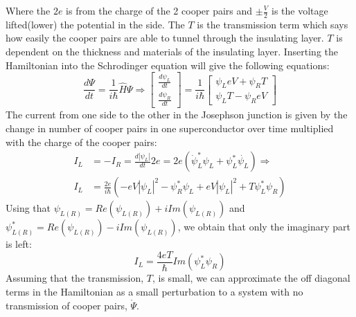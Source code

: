         Where the $2e$ is from the charge of the 2 cooper pairs and $ \pm \frac{V}{2}$ is the voltage lifted(lower) the potential in the side. The $T$ is the transmission term which says how easily the cooper pairs are able to tunnel through the insulating layer. $T$ is dependent on the thickness and materials of the insulating layer. Inserting the Hamiltonian into the Schrodinger equation will give the following equations: 
        \begin{equation}
                \frac{d \Psi}{d t} 
            =
                \frac{1}{i \hbar}\hat{H}\Psi
            \Rightarrow
                \begin{bmatrix}
                    \frac{d \psi_L}{dt} \\
                    \frac{d \psi_R}{dt} 
                \end{bmatrix}  
            =    
                \frac{1}{i \hbar} 
                \begin{bmatrix}
                \psi_L e V + \psi_R T \\
                \psi_L T - \psi_R e V  
                \end{bmatrix}
        \end{equation}
        The current from one side to the other in the Josephson junction is given by the change in number of cooper pairs in one superconductor over time multiplied with the charge of the cooper pairs: 
        \begin{equation}
            \begin{aligned}
                I_L &= -I_R =  \frac{d|\psi_L|}{dt} 2e = 2e \left( \Dot{\psi}_L^* \psi_L + \psi_L^* \Dot{\psi_L} \right) \Rightarrow 
                \\
                I_L &= \frac{2e}{i\hbar} \left( -eV |\psi_L|^2 - \psi_R^*\psi_L + e V  |\psi_L|^2 + T \psi_L^*\psi_R \right) 
            \end{aligned}
        \end{equation}
        Using that $\psi_{L(R)} = Re(\psi_{L(R)}) + i Im(\psi_{L(R)})$ and $\psi_{L(R)}^* = Re(\psi_{L(R)}) - i Im(\psi_{L(R)})$, we obtain that only the imaginary part is left: 
        \begin{equation}
            I_L = \frac{4 e T}{\hbar} Im(\psi^*_L \psi_R)
        \end{equation}
        Assuming that the transmission, $T$, is small, we can approximate the off diagonal terms in the Hamiltonian as a small perturbation to a system with no transmission of cooper pairs, $\mathring{\Psi}$. 
